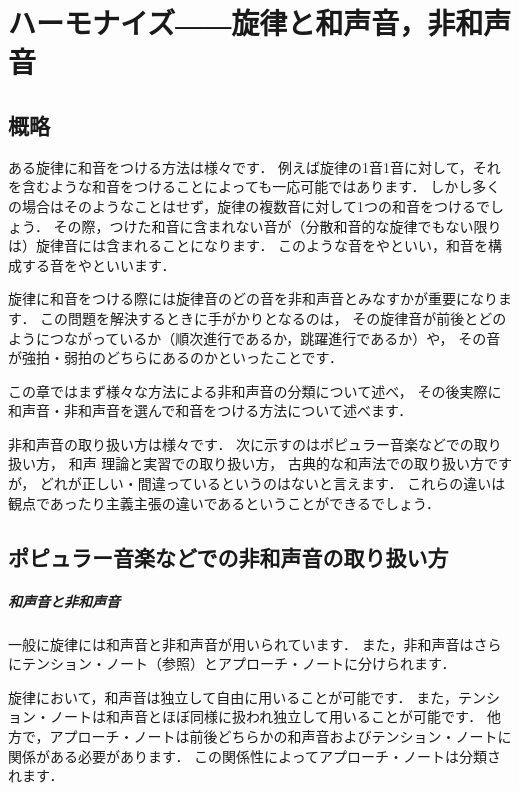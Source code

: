 \documentclass[dvipdfmx,uplatex,b5paper,openany,jbase=12Q,nomag*,textwidth-limit=44%
               ]{gachimuchi}
\begin{document}
\chapter{ハーモナイズ――旋律と和声音，非和声音}
\section{概略}
ある旋律に和音をつける方法は様々です．
例えば旋律の1音1音に対して，それを含むような和音をつけることによっても一応可能ではあります．
しかし多くの場合はそのようなことはせず，旋律の複数音に対して1つの和音をつけるでしょう．
その際，つけた和音に含まれない音が（分散和音的な旋律でもない限りは）旋律音には含まれることになります．
このような音をやといい，和音を構成する音をやといいます．

旋律に和音をつける際には旋律音のどの音を非和声音とみなすかが重要になります．
この問題を解決するときに手がかりとなるのは，
その旋律音が前後とどのようにつながっているか（順次進行であるか，跳躍進行であるか）や，
その音が強拍・弱拍のどちらにあるのかといったことです．

この章ではまず様々な方法による非和声音の分類について述べ，
その後実際に和声音・非和声音を選んで和音をつける方法について述べます．

\begin{Yodan}
非和声音の取り扱い方は様々です．
次に示すのはポピュラー音楽などでの取り扱い方\cite{rgYAHAGI1}，
和声 理論と実習\cite{chSHIMAOKA1i,chSHIMAOKA1ii,chSHIMAOKA1iii}での取り扱い方，
古典的な和声法\cite{chSHIMOFUSA1,chSHIMOFUSA2,mgKIKUCHI1}での取り扱い方ですが，
どれが正しい・間違っているというのはないと言えます．
これらの違いは観点であったり主義主張の違いであるということができるでしょう．
\end{Yodan}
\section{ポピュラー音楽などでの非和声音の取り扱い方}
\paragraph{和声音と非和声音}
一般に旋律には和声音と非和声音が用いられています．
また，非和声音はさらにテンション・ノート（参照）とアプローチ・ノートに分けられます．

旋律において，和声音は独立して自由に用いることが可能です．
また，テンション・ノートは和声音とほぼ同様に扱われ独立して用いることが可能です．
他方で，アプローチ・ノートは前後どちらかの和声音およびテンション・ノートに関係がある必要があります．
この関係性によってアプローチ・ノートは分類されます．
\end{document}
